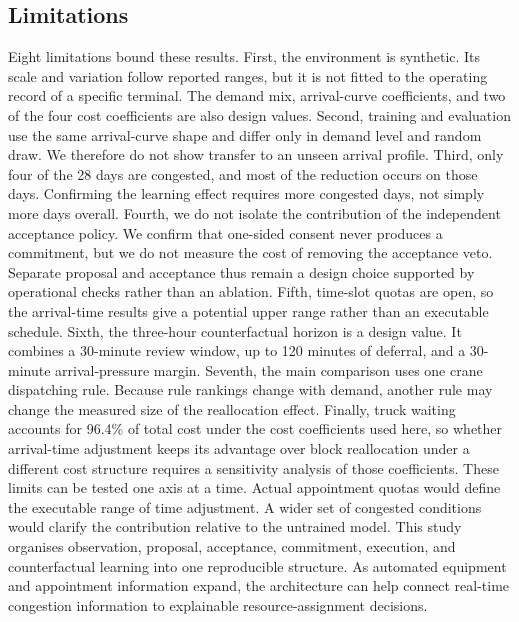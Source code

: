 \subsection{Limitations}
\label{sec:limits}
Eight limitations bound these results. First, the environment is
synthetic. Its scale and variation follow reported ranges, but it is not
fitted to the operating record of a specific terminal. The demand mix,
arrival-curve coefficients, and two of the four cost coefficients are
also design values. Second, training and evaluation use the same
arrival-curve shape and differ only in demand level and random draw. We
therefore do not show transfer to an unseen arrival profile. Third, only
four of the 28 days are congested, and most of the reduction occurs on
those days. Confirming the learning effect requires more congested days,
not simply more days overall. Fourth, we do not isolate the contribution
of the independent acceptance policy. We confirm that one-sided consent
never produces a commitment, but we do not measure the cost of removing
the acceptance veto. Separate proposal and acceptance thus remain a
design choice supported by operational checks rather than an ablation.
Fifth, time-slot quotas are open, so the arrival-time results give a
potential upper range rather than an executable schedule. Sixth, the
three-hour counterfactual horizon is a design value. It combines a
30-minute review window, up to 120 minutes of deferral, and a 30-minute
arrival-pressure margin. Seventh, the main comparison uses one crane
dispatching rule. Because rule rankings change with demand, another rule
may change the measured size of the reallocation effect. Finally, truck
waiting accounts for 96.4\% of total cost under the cost coefficients
used here, so whether arrival-time adjustment keeps its advantage over
block reallocation under a different cost structure requires a
sensitivity analysis of those coefficients.
These limits can be tested one axis at a time. Actual appointment quotas
would define the executable range of time adjustment. A wider set of
congested conditions would clarify the contribution relative to the
untrained model. This study organises observation, proposal, acceptance,
commitment, execution, and counterfactual learning into one reproducible
structure. As automated equipment and appointment information expand,
the architecture can help connect real-time congestion information to
explainable resource-assignment decisions.
